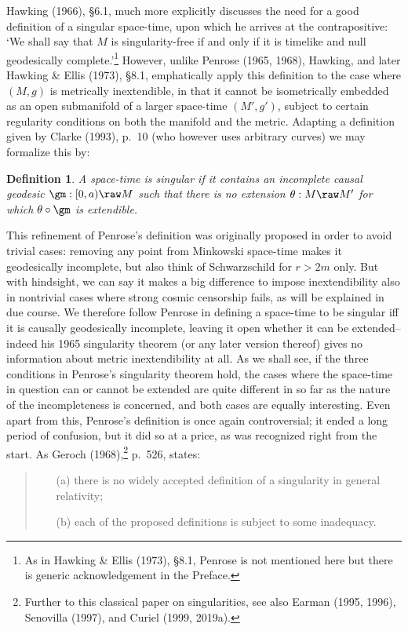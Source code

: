 \documentclass[11pt,a4paper]{article}
\newtheorem{definition}[theorem]{Definition}
\begin{document}
 Hawking (1966), \S 6.1, much more explicitly discusses the need for a good definition of a singular space-time, upon which he arrives at the contrapositive: `We shall say that $M$ is singularity-free if and only if it is timelike and null geodesically complete.'\footnote{As in Hawking \& Ellis (1973), \S 8.1, Penrose is not mentioned here but there is generic acknowledgement in the Preface.} However, unlike Penrose (1965, 1968), Hawking, and later  Hawking \& Ellis (1973), \S 8.1,
emphatically apply this definition to the case where $(M,g)$ is metrically inextendible, in that it cannot be isometrically embedded as an open submanifold of a larger space-time $(M',g')$, subject to certain regularity conditions on both the manifold and the metric. Adapting a definition given by Clarke (1993), p.\ 10 (who however uses arbitrary curves) we may formalize this by:
\begin{definition}
A space-time is \emph{singular} if it contains an incomplete causal geodesic $\gm:[0,a)\raw M$ such that there is no extension $\theta:M\raw M'$ for which $\theta\circ\gm$ is extendible.
\end{definition}
This refinement of Penrose's  definition was originally proposed in order to avoid trivial cases: removing any point from Minkowski space-time makes it geodesically incomplete, but also think of Schwarzschild for $r>2m$ only. But with hindsight, we can say it makes a big difference to impose inextendibility also in nontrivial cases where strong cosmic censorship fails, as will be explained in due course. 
We therefore follow Penrose in defining a space-time to be singular iff it is causally geodesically incomplete, leaving it open whether it can be extended--indeed his 1965 singularity theorem (or any later version thereof) gives no information about  metric inextendibility at all. 
As we shall see, if the three conditions in Penrose's singularity theorem hold,
 the cases where the space-time in question can or cannot be extended are quite different in so far as the 
  nature of the incompleteness is concerned, and both cases are equally interesting. 
Even apart from this, Penrose's definition is once again  controversial; it ended a long period of confusion, but it did so at a price, as was recognized right from the start. As Geroch (1968),\footnote{Further to this classical paper on singularities,
see also Earman (1995, 1996), Senovilla (1997), and Curiel (1999, 2019a). }
 p.\ 526, states: \begin{quote}
\begin{small}
\begin{enumerate}
\item[(a)] there is no widely accepted definition of a singularity in general relativity;
\item[(b)] each of the proposed definitions is subject to some inadequacy.
\end{enumerate}
\end{small}
\end{quote}
\end{document}
